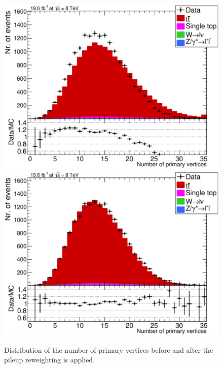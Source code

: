 \begin{figure}[h!tp]
 \centering
 \includegraphics[width = 0.47 \textwidth]{Chapters/Chapter4_EvtSel/Figures/nPV_AllCuts_noPU_mu_Stack.pdf} \hspace{0.2cm}
 \includegraphics[width = 0.47 \textwidth]{Chapters/Chapter4_EvtSel/Figures/nPV_AllCuts_mu_Stack.pdf}
 \caption{Distribution of the number of primary vertices before and after the pileup reweighting is applied.} \label{fig::PUInfl}
\end{figure}

